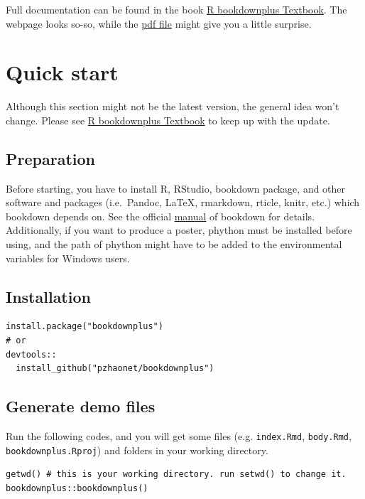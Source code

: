 \documentclass[]{book}
\theoremstyle{definition}
\theoremstyle{definition}
\theoremstyle{definition}
\theoremstyle{remark}
\begin{document}
Full documentation can be found in the book
\href{https://bookdown.org/baydap/bookdownplus}{R bookdownplus
Textbook}. The webpage looks so-so, while the
\href{https://bookdown.org/baydap/bookdownplus/bookdownplus.pdf}{pdf
file} might give you a little surprise.

\section{Quick start}\label{quick-start}

Although this section might not be the latest version, the general idea
won't change. Please see
\href{https://bookdown.org/baydap/bookdownplus}{R bookdownplus Textbook}
to keep up with the update.

\subsection{Preparation}\label{preparation}

Before starting, you have to install R, RStudio, bookdown package, and
other software and packages (i.e.~Pandoc, LaTeX, rmarkdown, rticle,
knitr, etc.) which bookdown depends on. See the official
\href{https://bookdown.org/yihui/bookdown/}{manual} of bookdown for
details. Additionally, if you want to produce a poster, phython must be
installed before using, and the path of phython might have to be added
to the environmental variables for Windows users.

\subsection{Installation}\label{installation}

\begin{verbatim}
install.package("bookdownplus")
# or
devtools::
  install_github("pzhaonet/bookdownplus")
\end{verbatim}

\subsection{Generate demo files}\label{generate-demo-files}

Run the following codes, and you will get some files (e.g.
\texttt{index.Rmd}, \texttt{body.Rmd}, \texttt{bookdownplus.Rproj}) and
folders in your working directory.

\begin{verbatim}
getwd() # this is your working directory. run setwd() to change it.
bookdownplus::bookdownplus()
\end{verbatim}
\end{document}
